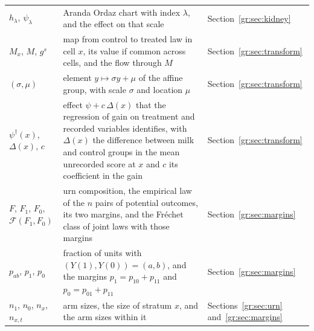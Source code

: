 {\noindent\small\centering
\setlength{\tabcolsep}{4pt}\renewcommand{\arraystretch}{1.1}
\begin{tabular}{>{\raggedright\arraybackslash}p{1.0in}>{\raggedright\arraybackslash}p{2.15in}>{\raggedright\arraybackslash}p{0.95in}}
$h_\lambda$, $\psi_\lambda$ & Aranda Ordaz chart with index $\lambda$, and the effect on that scale & Section~\ref{gr:sec:kidney} \\
$M_x$, $M$, $g^{s}$ & map from control to treated law in cell $x$, its value if common across cells, and the flow through $M$ & Section~\ref{gr:sec:transform} \\
$(\sigma, \mu)$ & element $y \mapsto \sigma y + \mu$ of the affine group, with scale $\sigma$ and location $\mu$ & Section~\ref{gr:sec:transform} \\
$\psi^{\dagger}(x)$, $\Delta(x)$, $c$ & effect $\psi + c\,\Delta(x)$ that the regression of gain on treatment and recorded variables identifies, with $\Delta(x)$ the difference between milk and control groups in the mean unrecorded score at $x$ and $c$ its coefficient in the gain & Section~\ref{gr:sec:transform} \\
$F$, $F_1$, $F_0$, $\mathcal F(F_1, F_0)$ & urn composition, the empirical law of the $n$ pairs of potential outcomes, its two margins, and the Fr\'echet class of joint laws with those margins & Section~\ref{gr:sec:margins} \\
$p_{ab}$, $p_1$, $p_0$ & fraction of units with $(Y(1), Y(0)) = (a, b)$, and the margins $p_1 = p_{10} + p_{11}$ and $p_0 = p_{01} + p_{11}$ & Section~\ref{gr:sec:margins} \\
$n_1$, $n_0$, $n_x$, $n_{x,t}$ & arm sizes, the size of stratum $x$, and the arm sizes within it & Sections~\ref{gr:sec:urn} and~\ref{gr:sec:margins} \\
\end{tabular}\par}

